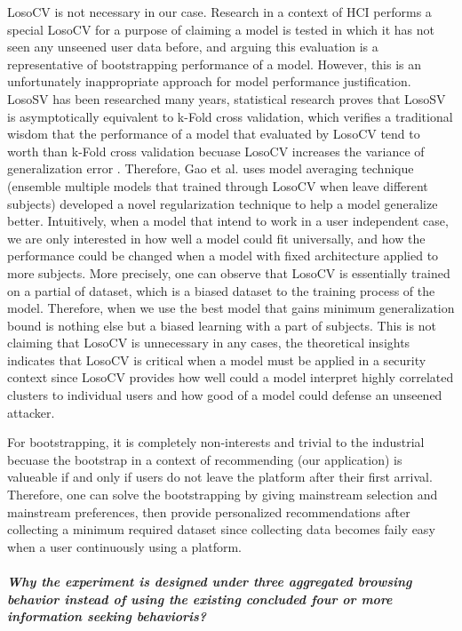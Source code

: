 LosoCV is not necessary in our case. Research in a context of HCI performs a special LosoCV
for a purpose of claiming a model is tested in which it has not seen any unseened user data before,
and arguing this evaluation is a representative of bootstrapping performance of a model.
However, this is an unfortunately inappropriate approach for model performance justification.
LosoSV has been researched many years, statistical research \cite{xu2012asymptotic} proves 
that LosoSV is asymptotically equivalent to k-Fold cross validation, which verifies 
a traditional wisdom that the performance of 
a model that evaluated by LosoCV tend to worth than k-Fold cross validation becuase
LosoCV increases the variance of generalization error \cite{bengio2004no}. Therefore, Gao et al. uses 
model averaging technique (ensemble multiple models that trained through LosoCV when 
leave different subjects) developed a novel regularization technique \cite{gao2016139} 
to help a model generalize better.
Intuitively, when a model that intend to work in a user independent case, 
we are only interested in how well a model could fit universally, 
and how the performance could be changed when a model with fixed architecture applied to more subjects.
More precisely, one can observe that LosoCV is essentially trained on a partial of dataset, 
which is a biased dataset to the training process of the model. Therefore, when we use 
the best model that gains minimum generalization bound is nothing else but a biased learning 
with a part of subjects.
This is not claiming that LosoCV is unnecessary in any cases, the theoretical insights indicates
that LosoCV is critical when a model must be applied in a security context since 
LosoCV provides how well could a model interpret highly correlated clusters 
to individual users and how good of a model could defense an unseened attacker.

For bootstrapping, it is completely non-interests and trivial to the industrial 
becuase the bootstrap in a context of recommending (our application) is valueable if and only if
users do not leave the platform after their first arrival. Therefore, one can solve
the bootstrapping by giving mainstream selection and mainstream preferences, then provide
personalized recommendations after collecting a minimum required dataset since 
collecting data becomes faily easy when a user continuously using a platform.

\paragraph{\emph{Why the experiment is designed under three aggregated browsing behavior instead of
using the existing concluded four or more information seeking behavioris?}}


